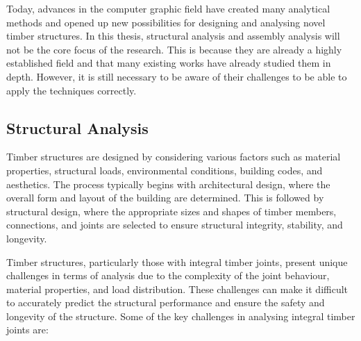\documentclass[11pt]{book}
\begin{document}
Today, advances in the computer graphic field have created many analytical methods and opened up new possibilities for designing and analysing novel timber structures. In this thesis, structural analysis and assembly analysis will not be the core focus of the research. This is because they are already a highly established field and that many existing works have already studied them in depth. However, it is still necessary to be aware of their challenges to be able to apply the techniques correctly.

\subsection{Structural Analysis}

Timber structures are designed by considering various factors such as material properties, structural loads, environmental conditions, building codes, and aesthetics. The process typically begins with architectural design, where the overall form and layout of the building are determined. This is followed by structural design, where the appropriate sizes and shapes of timber members, connections, and joints are selected to ensure structural integrity, stability, and longevity.

Timber structures, particularly those with integral timber joints, present unique challenges in terms of analysis due to the complexity of the joint behaviour, material properties, and load distribution. These challenges can make it difficult to accurately predict the structural performance and ensure the safety and longevity of the structure. Some of the key challenges in analysing integral timber joints are:
\end{document}
